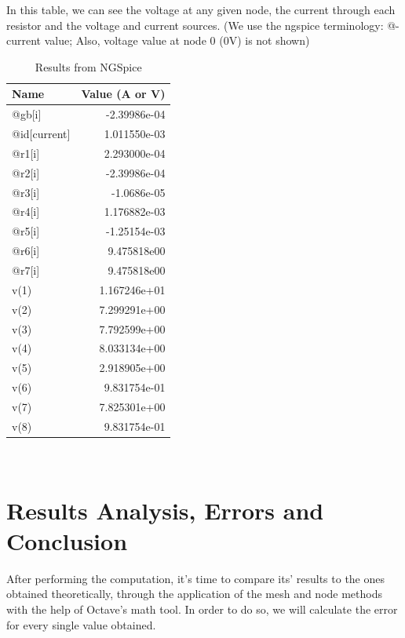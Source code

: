 \documentclass[11en, a4paper, oneside]{article}
\begin{document}
In this table, we can see the voltage at any given node, the current through each resistor and the voltage and current sources. (We use the ngspice terminology: @-current value; Also, voltage value at node 0 (0V) is not shown)
\clearpage
\begin{table}[h]
\label{tab1}
\begin{center}
\begin{tabular}{|l|r|}
\hline
\textbf{Name}    & \textbf{Value (A or V)} \\\hline
@gb{[}i{]}       & -2.39986e-04            \\\hline
@id{[}current{]} & 1.011550e-03            \\\hline
@r1{[}i{]}       & 2.293000e-04            \\\hline
@r2{[}i{]}       & -2.39986e-04            \\\hline
@r3{[}i{]}       & -1.0686e-05             \\\hline
@r4{[}i{]}       & 1.176882e-03            \\\hline
@r5{[}i{]}       & -1.25154e-03            \\\hline
@r6{[}i{]}       & 9.475818e00             \\\hline
@r7{[}i{]}       & 9.475818e00             \\\hline
v(1)             & 1.167246e+01            \\\hline
v(2)             & 7.299291e+00            \\\hline
v(3)             & 7.792599e+00            \\\hline
v(4)             & 8.033134e+00            \\\hline
v(5)             & 2.918905e+00            \\\hline
v(6)             & 9.831754e-01            \\\hline
v(7)             & 7.825301e+00            \\\hline
v(8)             & 9.831754e-01         \\\hline

\end{tabular}
\caption{Results from NGSpice} \label{tab:sometab}
\end{center}
\
\end{table}



\section{Results Analysis, Errors and Conclusion}
\label{resan}
After performing the computation, it's time to compare its' results to the ones obtained theoretically, through the application of the mesh and node methods with the help of Octave's math tool. In order to do so, we will calculate the error for every single value obtained.
\end{document}
